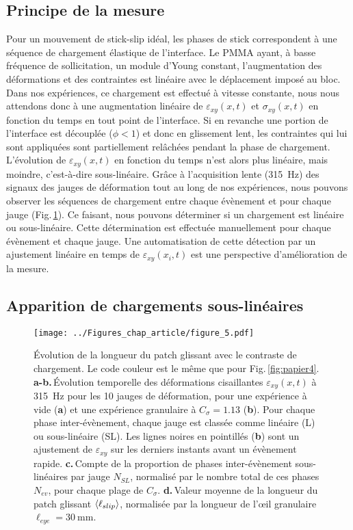 \subsection{Principe de la mesure}
Pour un mouvement de stick-slip idéal, les phases de stick correspondent à une séquence de chargement élastique de l'interface. Le PMMA ayant, à basse fréquence de sollicitation, un module d'Young constant, l'augmentation des déformations et des contraintes est linéaire avec le déplacement imposé au bloc. Dans nos expériences, ce chargement est effectué à vitesse constante, nous nous attendons donc à une augmentation linéaire de $\varepsilon_{xy}(x,t)$ et $\sigma_{xy}(x,t)$ en fonction du temps en tout point de l'interface. Si en revanche une portion de l'interface est découplée ($\phi<1$) et donc en glissement lent, les contraintes qui lui sont appliquées sont partiellement relâchées pendant la phase de chargement. L'évolution de $\varepsilon_{xy}(x,t)$ en fonction du temps n'est alors plus linéaire, mais moindre, c'est-à-dire sous-linéaire. Grâce à l'acquisition lente (\SI{315}{\hertz}) des signaux des jauges de déformation tout au long de nos expériences, nous pouvons observer les séquences de chargement entre chaque évènement et pour chaque jauge (Fig.\,\ref{fig:papier5}). Ce faisant, nous pouvons déterminer si un chargement est linéaire ou sous-linéaire. Cette détermination est effectuée manuellement pour chaque évènement et chaque jauge. Une automatisation de cette détection par un ajustement linéaire en temps de $\varepsilon_{xy}(x_i,t)$ est une perspective d'amélioration de la mesure.



\subsection{Apparition de chargements sous-linéaires}


\begin{figure}[p]
\centering
\texttt{[image: ../Figures\_chap\_article/figure\_5.pdf]}
\caption[Chargements sous-linéaires et linéaires]{Évolution de la longueur du patch glissant avec le contraste de chargement. Le code couleur est le même que pour Fig.\,\ref{fig:papier4}. \textbf{a-b.}\,Évolution temporelle des déformations cisaillantes $\varepsilon_{xy}(x,t)$ à \SI{315}{\hertz} pour les 10 jauges de déformation, pour une expérience à vide (\textbf{a}) et une expérience granulaire à $C_\sigma=1.13$ (\textbf{b}). Pour chaque phase inter-évènement, chaque jauge est classée comme linéaire (L) ou sous-linéaire (SL). Les lignes noires en pointillés (\textbf{b}) sont un ajustement de $\varepsilon_{xy}$ sur les derniers instants avant un évènement rapide. \textbf{c.}\,Compte de la proportion de phases inter-évènement sous-linéaires par jauge $N_{SL}$, normalisé par le nombre total de ces phases $N_{ev}$, pour chaque plage de $C_{\sigma}$. \textbf{d.}\,Valeur moyenne de la longueur du patch glissant $\left\langle {\ell_{slip}} \right\rangle$, normalisée par la longueur de l'œil granulaire $\ell_{eye}=\SI{30}{\milli\meter}$.}
\label{fig:papier5}
\end{figure}


